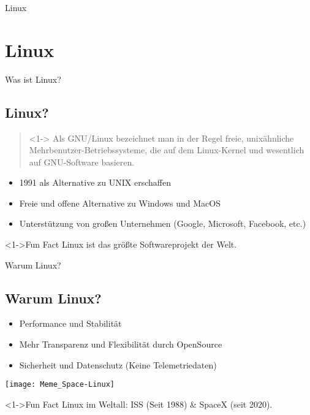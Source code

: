 
\begin{frame}{Linux}
    \section{Linux}\label{sec:Linux}
\end{frame}

\begin{frame}{Was ist Linux?}
    \subsection{Linux?}\label{subsec:linux?}

    \begin{quote}<1->
        Als GNU/Linux bezeichnet man in der Regel freie, unixähnliche Mehrbenutzer-Betriebssysteme, die auf dem Linux-Kernel und wesentlich auf GNU-Software basieren.
    \end{quote}

    \begin{itemize}
        \item<2-> 1991 als Alternative zu UNIX erschaffen
        \item<3-> Freie und offene Alternative zu Windows und MacOS
        \item<4-> Unterstützung von großen Unternehmen (Google, Microsoft, Facebook, etc.)
    \end{itemize}
    \vspace{0.5cm}
    \begin{exampleblock}<1->{Fun Fact}
        Linux ist das größte Softwareprojekt der Welt.
    \end{exampleblock}

\end{frame}

\begin{frame}{Warum Linux?}
    \subsection{Warum Linux?}\label{subsec:warum-linux?}

    \begin{itemize}
        \item<1-> Performance und Stabilität
        \item<2-> Mehr Transparenz und Flexibilität durch OpenSource
        \item<3-> Sicherheit und Datenschutz (Keine Telemetriedaten)
    \end{itemize}
    \vspace{0.5cm}

    \texttt{[image: Meme\_Space-Linux]}
    \begin{exampleblock}<1->{Fun Fact}
        Linux im Weltall: ISS (Seit 1988) \& SpaceX (seit 2020).
    \end{exampleblock}

\end{frame}

